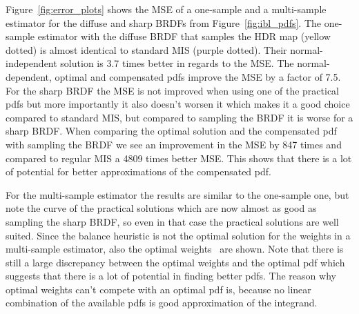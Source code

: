 Figure~\ref{fig:error_plots} shows the MSE of a one-sample and a multi-sample estimator for the diffuse and sharp BRDFs from Figure~\ref{fig:ibl_pdfs}.
The one-sample estimator with the diffuse BRDF that samples the HDR map (yellow dotted) is almost identical to standard MIS (purple dotted).
Their normal-independent solution is 3.7 times better in regards to the MSE.
The normal-dependent, optimal and compensated pdfs improve the MSE by a factor of 7.5.
For the sharp BRDF the MSE is not improved when using one of the practical pdfs but more importantly it also doesn't worsen it which makes it a good choice compared to standard MIS,
but compared to sampling the BRDF it is worse for a sharp BRDF.
When comparing the optimal solution and the compensated pdf with sampling the BRDF we see an improvement in the MSE by 847 times and compared to regular MIS a 4809 times better MSE.
This shows that there is a lot of potential for better approximations of the compensated pdf.

For the multi-sample estimator the results are similar to the one-sample one,
but note the curve of the practical solutions which are now almost as good as sampling the sharp BRDF,
so even in that case the practical solutions are well suited.
Since the balance heuristic is not the optimal solution for the weights in a multi-sample estimator,
also the optimal weights~\cite{Kondapaneni2019} are shown.
Note that there is still a large discrepancy between the optimal weights and the optimal pdf which suggests that there is a lot of potential in finding better pdfs.
The reason why optimal weights can't compete with an optimal pdf is, because no linear combination of the available pdfs is good approximation of the integrand.

